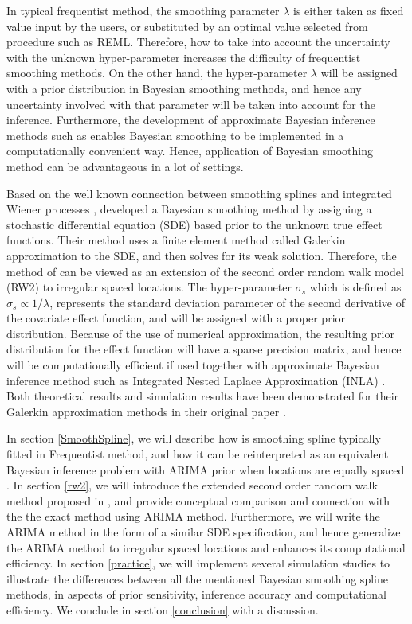 \documentclass{article}
\begin{document}
In typical frequentist method, the smoothing parameter $\lambda$ is either taken as fixed value input by the users, or substituted by an optimal value selected from procedure such as REML. Therefore, how to take into account the uncertainty with the unknown hyper-parameter increases the difficulty of frequentist smoothing methods. On the other hand, the hyper-parameter $\lambda$ will be assigned with a prior distribution in Bayesian smoothing methods, and hence any uncertainty involved with that parameter will be taken into account for the inference. Furthermore, the development of approximate Bayesian inference methods such as \cite{inla} enables Bayesian smoothing to be implemented in a computationally convenient way. Hence, application of Bayesian smoothing method can be advantageous in a lot of settings.


Based on the well known connection between smoothing splines and integrated Wiener processes \citep{wahba}, \cite{rw2} developed a Bayesian smoothing method by assigning a stochastic differential equation (SDE) based prior to the unknown true effect functions. 
Their method uses a finite element method called Galerkin approximation to the SDE, and then solves for its weak solution. Therefore, the method of \cite{inla} can be viewed as an extension of the second order random walk model (RW2) to irregular spaced locations.
The hyper-parameter $\sigma_s$ which is defined as $\sigma_s \propto 1/\lambda$, represents the standard deviation parameter of the second derivative of the covariate effect function, and will be assigned with a proper prior distribution. Because of the use of numerical approximation, the resulting prior distribution for the effect function will have a sparse precision matrix, and hence will be computationally efficient if used together with approximate Bayesian inference method such as Integrated Nested Laplace Approximation (INLA) \citep{inla}. Both theoretical results and simulation results have been demonstrated for their Galerkin approximation methods in their original paper \citep{rw2}.


In section \ref{SmoothSpline}, we will describe how is smoothing spline typically fitted in Frequentist method, and how it can be reinterpreted as an equivalent Bayesian inference problem with ARIMA prior when locations are equally spaced \citep{ARIMA}. In section \ref{rw2}, we will introduce the extended second order random walk method proposed in \cite{rw2}, and provide conceptual comparison and connection with the the exact method using ARIMA method. Furthermore, we will write the ARIMA method in the form of a similar SDE specification, and hence generalize the ARIMA method to irregular spaced locations and enhances its computational efficiency. In section \ref{practice}, we will implement several simulation studies to illustrate the differences between all the mentioned Bayesian smoothing spline methods, in aspects of prior sensitivity, inference accuracy and computational efficiency. We conclude in section \ref{conclusion} with a discussion.
\end{document}
